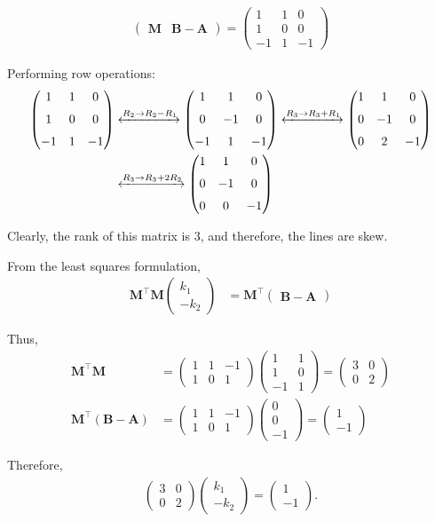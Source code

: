 \documentclass{beamer}
\numberwithin{equation}{section}
\theoremstyle{remark}
\newcommand{\myvec}[1]{\ensuremath{\begin{pmatrix}#1\end{pmatrix}}}
\let\vec\mathbf
\begin{document}
\begin{frame}

\begin{align}
\myvec{\vec{M} & \vec{B}-\vec{A}} = \myvec{1 & 1 & 0 \\1 & 0 & 0 \\-1 & 1 & -1}
\end{align}

Performing row operations:
\begin{align}
    \myvec{
        1 & 1 & 0 \\[6pt]
        1 & 0 & 0 \\[6pt]
       -1 & 1 & -1
    }
    &\xleftrightarrow{R_2 \to R_2 - R_1}
    \myvec{
        1 & 1 & 0 \\[6pt]
        0 & -1 & 0 \\[6pt]
       -1 & 1 & -1
    }
    \xleftrightarrow{R_3 \to R_3 + R_1}
    \myvec{
        1 & 1 & 0 \\[6pt]
        0 & -1 & 0 \\[6pt]
        0 & 2 & -1
      }\\
    &\xleftrightarrow{R_3 \to R_3 + 2R_2}
    \myvec{
        1 & 1 & 0 \\[6pt]
        0 & -1 & 0 \\[6pt]
        0 & 0 & -1
    }
\end{align}

Clearly, the rank of this matrix is 3, and therefore, the lines are skew.

\end{frame}

\begin{frame}

From the least squares formulation,  
\begin{align}
  \vec{M}^\top\vec{M}\myvec{k_1 \\ -k_2} &= \vec{M}^\top\myvec{\vec{B}-\vec{A}}
\end{align}

Thus,
\begin{align}
\vec{M}^\top\vec{M} &= 
\myvec{
1 & 1 & -1 \\
1 & 0 & 1
}
\myvec{
1 & 1 \\
1 & 0 \\
-1 & 1
} = \myvec{3 & 0 \\ 0 & 2} \\
\vec{M}^\top(\vec{B}-\vec{A}) &= 
\myvec{1 & 1 & -1 \\ 1 & 0 & 1}
\myvec{0\\0\\-1} 
= \myvec{1 \\ -1}
\end{align}

Therefore,
\begin{align}
\myvec{3 & 0 \\ 0 & 2}
\myvec{k_1 \\ -k_2}
= \myvec{1\\-1}.
\end{align}

\end{frame}
\end{document}
